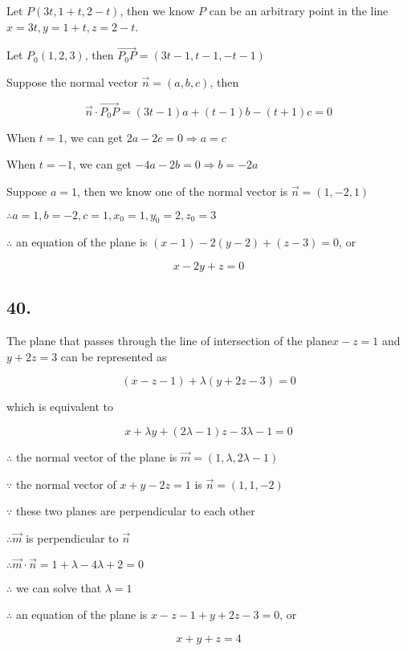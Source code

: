 \documentclass{article}
\begin{document}
    Let $P(3t, 1 + t, 2 - t)$, then we know $P$ can be an arbitrary point in the line $x=3t, y=1+t, z=2-t$.
    
    Let $P_0 (1, 2, 3)$, then $\overrightarrow{P_0P} = (3t - 1, t - 1, - t - 1)$
    
    Suppose the normal vector $\overrightarrow{n} = (a, b, c)$, then

    $$\overrightarrow{n} \cdot \overrightarrow{P_0P} = (3t-1)a + (t-1)b - (t+1)c = 0$$

    When $t = 1$, we can get $2a - 2c = 0 \Rightarrow a=c$

    When $t=-1$, we can get $-4a - 2b=0 \Rightarrow b = -2a$

    Suppose $a=1$, then we know one of the normal vector is $\overrightarrow{n} = (1, -2, 1)$

    $\therefore a=1, b=-2, c=1, x_0 = 1, y_0 = 2, z_0 =3$

    $\therefore$ an equation of the plane is $(x - 1) - 2(y - 2) + (z - 3) = 0$, or 

    $$x-2y+z=0$$

    \subsection*{40.}

    The plane that passes through the line of intersection of the plane$x - z= 1$ and $y+2z=3$ can be represented as

    $$(x-z-1) + \lambda (y+2z-3) = 0$$

    which is equivalent to

    $$x + \lambda y + (2\lambda - 1)z -3\lambda - 1 = 0$$

    $\therefore$ the normal vector of the plane is $\overrightarrow{m}=(1, \lambda, 2\lambda - 1)$

    $\because$ the normal vector of $x+y-2z=1$ is $\overrightarrow{n} = (1, 1, -2)$

    $\because$ these two planes are perpendicular to each other

    $\therefore \overrightarrow{m}$ is perpendicular to $\overrightarrow{n}$

    $\therefore \overrightarrow{m} \cdot \overrightarrow{n} = 1 + \lambda - 4\lambda + 2 = 0$

    $\therefore$ we can solve that $\lambda = 1$

    $\therefore$ an equation of the plane is $x - z - 1 + y + 2z - 3 = 0$, or 

    $$x + y + z = 4$$
\end{document}
